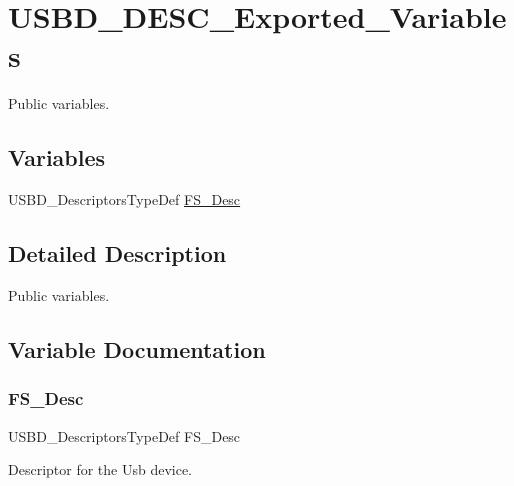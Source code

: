 \hypertarget{group__USBD__DESC__Exported__Variables}{}\section{U\+S\+B\+D\+\_\+\+D\+E\+S\+C\+\_\+\+Exported\+\_\+\+Variables}
\label{group__USBD__DESC__Exported__Variables}


Public variables.  


\subsection*{Variables}
\begin{DoxyCompactItemize}
\item 
U\+S\+B\+D\+\_\+\+Descriptors\+Type\+Def \hyperlink{group__USBD__DESC__Exported__Variables_gae36d67393118d9d8531a8d633e23a797}{F\+S\+\_\+\+Desc}
\end{DoxyCompactItemize}


\subsection{Detailed Description}
Public variables. 



\subsection{Variable Documentation}
\mbox{\label{group__USBD__DESC__Exported__Variables_gae36d67393118d9d8531a8d633e23a797}} 
\subsubsection{\texorpdfstring{F\+S\+\_\+\+Desc}{FS\_Desc}}
{\footnotesize\ttfamily U\+S\+B\+D\+\_\+\+Descriptors\+Type\+Def F\+S\+\_\+\+Desc}

Descriptor for the Usb device. 